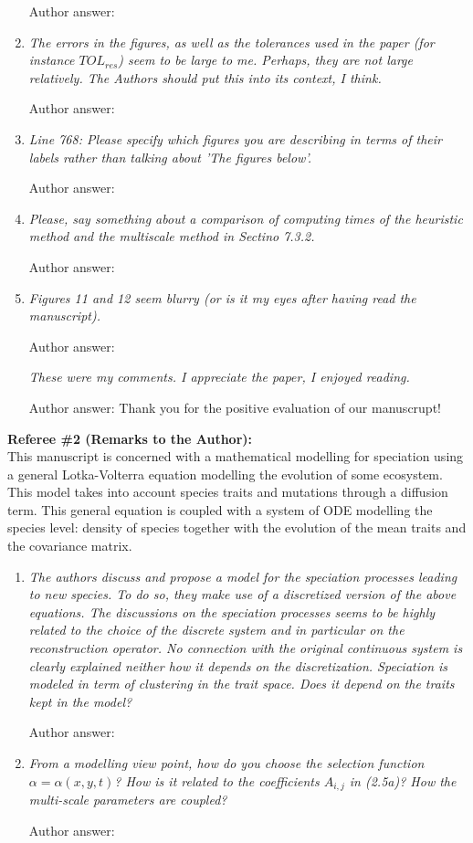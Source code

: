 \documentclass[a4paper,11pt]{scrartcl}
\begin{document}
\begin{enumerate}
Author answer:

\item
\textit{The errors in the figures, as well as the tolerances used in the paper (for instance $TOL_{res}$) seem to be large to me. Perhaps, they are not large relatively. The Authors should put this into its context, I think.}

Author answer:

\item
\textit{Line 768: Please specify which figures you are describing in terms of their labels rather than talking about 'The figures below'.}

Author answer:

\item
\textit{Please, say something about a comparison of computing times of the heuristic method and the multiscale method in Sectino 7.3.2.}

Author answer:

\item
\textit{Figures 11 and 12 seem blurry (or is it my eyes after having read the manuscript).}

Author answer:

\textit{These were my comments. I appreciate the paper, I enjoyed reading.}

Author answer: Thank you for the positive evaluation of our manuscrupt!

\end{enumerate}
\textbf{Referee \#2  (Remarks to the Author):}\\

This manuscript is concerned with a mathematical modelling for speciation using a general Lotka-Volterra equation modelling the evolution of some ecosystem. This model takes into account species traits and mutations through a diffusion term. This general equation is coupled with a system of ODE modelling the species level: density of species together with the evolution of the mean traits and the covariance matrix.

\begin{enumerate}
\item
\textit{The authors discuss and propose a model for the speciation processes leading to new species. To do so, they make use of a discretized version of the above equations. The discussions on the speciation processes seems to be highly related to the choice of the discrete system and in particular on the reconstruction operator. No connection with the original continuous system is clearly explained neither how it depends on the discretization.
Speciation is modeled in term of clustering in the trait space. Does it depend on the traits kept in the model?}

Author answer:

\item
\textit{From a modelling view point, how do you choose the selection function $\alpha=\alpha(x,y,t)$? How is it related to the coefficients $A_{i,j}$ in (2.5a)? How the multi-scale parameters are coupled?}

Author answer:
\end{enumerate}
\end{document}
